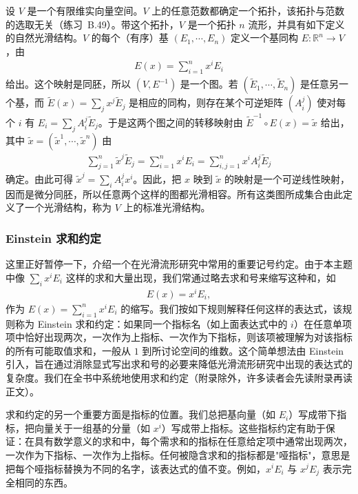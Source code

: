 \documentclass[../../main.tex]{subfiles}
\begin{document}
\begin{example}[有限维向量空间]\label{example:ch01-有限维向量空间}
设 $V$ 是一个有限维实向量空间。$V$ 上的任意范数都确定一个拓扑，该拓扑与范数的选取无关（练习~B.49）。带这个拓扑，$V$ 是一个拓扑 $n$ 流形，并具有如下定义的自然光滑结构。$V$ 的每个（有序）基 $(E_{1},\cdots ,E_{n})$ 定义一个基同构 $E:\mathbb{R}^{n}\to V$，由
\begin{align*}
E(x)=\sum_{i=1}^{n}x^{i}E_{i}
\end{align*}
给出。这个映射是同胚，所以 $(V,E^{-1})$ 是一个图。若 $(\widetilde{E}_{1},\cdots ,\widetilde{E}_{n})$ 是任意另一个基，而 $\widetilde{E}(x)=\sum_{j}x^{j}\widetilde{E}_{j}$ 是相应的同构，则存在某个可逆矩阵 $(A_{i}^{j})$ 使对每个 $i$ 有 $E_{i}=\sum_{j}A_{i}^{j}\widetilde{E}_{j}$。于是这两个图之间的转移映射由 $\widetilde{E}^{-1}\circ E(x)=\widetilde{x}$ 给出，其中 $\widetilde{x}=(\widetilde{x}^{1},\cdots ,\widetilde{x}^{n})$ 由
\begin{align*}
\sum_{j=1}^{n}\widetilde{x}^{j}\widetilde{E}_{j}=\sum_{i=1}^{n}x^{i}E_{i}=\sum_{i,j=1}^{n}x^{i}A_{i}^{j}\widetilde{E}_{j}
\end{align*}
确定。由此可得 $\widetilde{x}^{j}=\sum_{i}A_{i}^{j}x^{i}$。因此，把 $x$ 映到 $\widetilde{x}$ 的映射是一个可逆线性映射，因而是微分同胚，所以任意两个这样的图都光滑相容。所有这类图所成集合由此定义了一个光滑结构，称为 $V$ 上的标准光滑结构。
\end{example}

\subsubsection{Einstein 求和约定}\label{subsubsection:ch01-Einstein求和约定}
这里正好暂停一下，介绍一个在光滑流形研究中常用的重要记号约定。由于本主题中像 $\sum_{i}x^{i}E_{i}$ 这样的求和大量出现，我们常通过略去求和号来缩写这种和，如
\begin{align*}
E(x)=x^{i}E_{i},
\end{align*}
作为 $E(x)=\sum_{i=1}^{n}x^{i}E_{i}$ 的缩写。我们按如下规则解释任何这样的表达式，该规则称为 Einstein 求和约定：如果同一个指标名（如上面表达式中的 $i$）在任意单项项中恰好出现两次，一次作为上指标、一次作为下指标，则该项被理解为对该指标的所有可能取值求和，一般从 $1$ 到所讨论空间的维数。这个简单想法由 Einstein 引入，旨在通过消除显式写出求和号的必要来降低光滑流形研究中出现的表达式的复杂度。我们在全书中系统地使用求和约定（附录除外，许多读者会先读附录再读正文）。

求和约定的另一个重要方面是指标的位置。我们总把基向量（如 $E_{i}$）写成带下指标，把向量关于一组基的分量（如 $x^{i}$）写成带上指标。这些指标约定有助于保证：在具有数学意义的求和中，每个需求和的指标在任意给定项中通常出现两次，一次作为下指标、一次作为上指标。任何被隐含求和的指标都是"哑指标"，意思是把每个哑指标替换为不同的名字，该表达式的值不变。例如，$x^{i}E_{i}$ 与 $x^{j}E_{j}$ 表示完全相同的东西。
\end{document}
